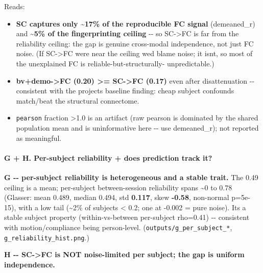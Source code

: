 Reads:

\begin{itemize}
\tightlist
\item
  \textbf{SC captures only \textasciitilde17\% of the reproducible FC signal} (demeaned\_r) and \textbf{\textasciitilde5\% of the fingerprinting ceiling} -\/- so SC-\textgreater FC is far from the reliability ceiling: the gap is genuine cross-modal independence, not just FC noise. (If SC-\textgreater FC were near the ceiling we\textquotesingle d blame noise; it isn\textquotesingle t, so most of the unexplained FC is reliable-but-structurally- unpredictable.)
\item
  \textbf{bv+demo-\textgreater FC (0.20) \textgreater= SC-\textgreater FC (0.17)} even after disattenuation -\/- consistent with the project\textquotesingle s baseline finding: cheap subject confounds match/beat the structural connectome.
\item
  \texttt{pearson} fraction \textgreater1.0 is an artifact (raw pearson is dominated by the shared population mean and is uninformative here -\/- use demeaned\_r); not reported as meaningful.
\end{itemize}

\paragraph{G + H. Per-subject reliability + does prediction track it?}\label{g--h-per-subject-reliability--does-prediction-track-it}

\textbf{G -\/- per-subject reliability is heterogeneous and a stable trait.} The 0.49 ceiling is a mean; per-subject between-session reliability spans \textasciitilde0 to 0.78 (Glasser: mean 0.489, median 0.494, std \textbf{0.117}, skew \textbf{-0.58}, non-normal p=5e-15), with a low tail (\textasciitilde2\% of subjects \textless{} 0.2; one at -0.002 = pure noise). It\textquotesingle s a stable subject property (within-vs-between per-subject rho=0.41) -\/- consistent with motion/compliance being person-level. (\texttt{outputs/g\_per\_subject\_*}, \texttt{g\_reliability\_hist.png}.)

\textbf{H -\/- SC-\textgreater FC is NOT noise-limited per subject; the gap is uniform independence.}

